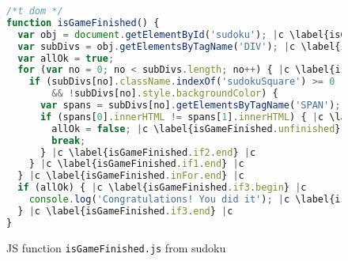 \documentclass[sigconf]{acmart}
\begin{document}
\begin{figure}[t]
  \begin{lstlisting}[style=htmlcssjs,language=JavaScript]
/*t dom */
function isGameFinished() {
  var obj = document.getElementById('sudoku'); |c \label{isGameFinished.getSudoku} |c
  var subDivs = obj.getElementsByTagName('DIV'); |c \label{isGameFinished.getDivs} |c
  var allOk = true;
  for (var no = 0; no < subDivs.length; no++) { |c \label{isGameFinished.inFor.begin} |c
    if (subDivs[no].className.indexOf('sudokuSquare') >= 0 |c \label{isGameFinished.if1.begin} |c 
        && !subDivs[no].style.backgroundColor) { 
      var spans = subDivs[no].getElementsByTagName('SPAN');
      if (spans[0].innerHTML != spans[1].innerHTML) { |c \label{isGameFinished.if2.begin} |c
        allOk = false; |c \label{isGameFinished.unfinished} |c
        break;
      } |c \label{isGameFinished.if2.end} |c
    } |c \label{isGameFinished.if1.end} |c
  } |c \label{isGameFinished.inFor.end} |c
  if (allOk) { |c \label{isGameFinished.if3.begin} |c 
    console.log('Congratulations! You did it'); |c \label{isGameFinished.finished} |c
  } |c \label{isGameFinished.if3.end} |c
}
\end{lstlisting}
  \caption{JS function \texttt{isGameFinished.js} from sudoku}
  \label{code.newGame}
\end{figure}
\end{document}
